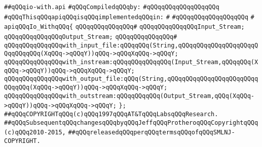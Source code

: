 \label{src/lib/src/io-with.api}
\verb|##qQQqio-with.api|\newline
\newline
\verb|#qQQqCompiledqQQqby:|\newline
\verb|#qQQqqQQqqQQqqQQqqQQq|\newline
\newline
\newline
\verb|#qQQqThisqQQqapiqQQqisqQQqimplementedqQQqin:|\newline
\verb|#|\newline
\verb|#qQQqqQQqqQQqqQQqqQQq|\newline
\verb|#|\newline
\verb|apiqQQqIo_WithqQQq{|\newline
\verb|qQQqqQQqqQQqqQQq#|\newline
\verb|qQQqqQQqqQQqqQQqInput_Stream;|\newline
\verb|qQQqqQQqqQQqqQQqOutput_Stream;|\newline
\verb|qQQqqQQqqQQqqQQq#|\newline
\verb|qQQqqQQqqQQqqQQqwith_input_file:qQQqqQQq(String,qQQqqQQqqQQqqQQqqQQqqQQqqQQqqQQq(XqQQq->qQQqY))qQQq->qQQqXqQQq->qQQqY;|\newline
\verb|qQQqqQQqqQQqqQQqwith_instream:qQQqqQQqqQQqqQQq(Input_Stream,qQQqqQQq(XqQQq->qQQqY))qQQq->qQQqXqQQq->qQQqY;|\newline
\verb|qQQqqQQqqQQqqQQqwith_output_file:qQQq(String,qQQqqQQqqQQqqQQqqQQqqQQqqQQqqQQq(XqQQq->qQQqY))qQQq->qQQqXqQQq->qQQqY;|\newline
\verb|qQQqqQQqqQQqqQQqwith_outstream:qQQqqQQqqQQq(Output_Stream,qQQq(XqQQq->qQQqY))qQQq->qQQqXqQQq->qQQqY;|\newline
\verb|};|\newline
\newline
\newline
\verb|##qQQqCOPYRIGHTqQQq(c)qQQq1997qQQqAT&TqQQqLabsqQQqResearch.|\newline
\verb|##qQQqSubsequentqQQqchangesqQQqbyqQQqJeffqQQqProtheroqQQqCopyrightqQQq(c)qQQq2010-2015,|\newline
\verb|##qQQqreleasedqQQqperqQQqtermsqQQqofqQQqSMLNJ-COPYRIGHT.|\newline


